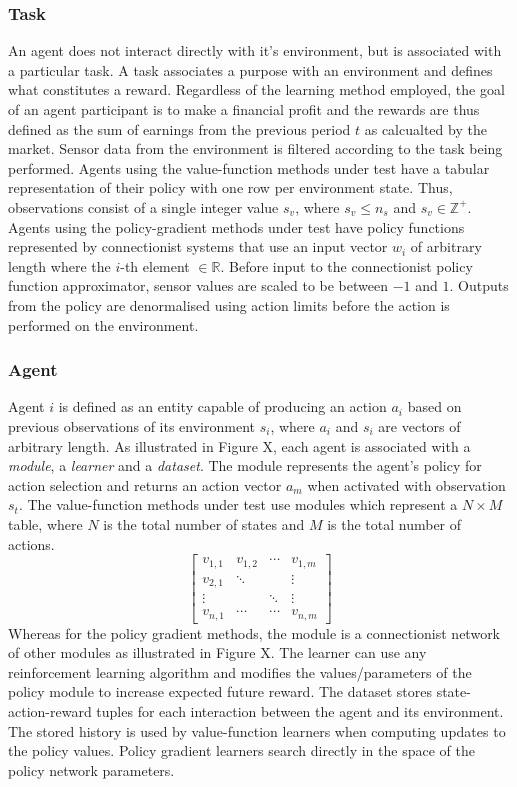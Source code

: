 \subsubsection{Task}
An agent does not interact directly with it's environment, but is associated
with a particular task.  A task associates a purpose with an environment and
defines what constitutes a reward.  Regardless of the learning method employed,
the goal of an agent participant is to make a financial profit and the rewards
are thus defined as the sum of earnings from the previous period $t$ as
calcualted by the market.  Sensor data from the environment is filtered
according to the task being performed.  Agents using the value-function methods
under test have a tabular representation of their policy with one row per
environment state.  Thus, observations consist of a single integer value $s_v$,
where $s_v \leq n_s$ and $s_v \in \mathbb{Z}^+$.  Agents using the
policy-gradient methods under test have policy functions represented by
connectionist systems that use an input vector $w_i$ of arbitrary length where
the $i$-th element $\in \mathbb{R}$.  Before input to the connectionist policy
function approximator, sensor values are scaled to be between $-1$ and $1$.
Outputs from the policy are denormalised using action limits before the
action is performed on the environment.

\subsubsection{Agent}
Agent $i$ is defined as an entity capable of producing an action $a_i$
based on previous observations of its environment $s_i$, where $a_i$ and $s_i$
are vectors of arbitrary length.  As illustrated in Figure X, each agent is
associated with a \textit{module}, a \textit{learner} and a \textit{dataset}.
The module represents the agent's policy for action selection and returns an
action vector $a_m$ when activated with observation $s_t$.  The value-function
methods under test use modules which represent a $N \times M$ table, where $N$
is the total number of states and $M$ is the total number of actions.
\begin{equation}
\begin{bmatrix}
v_{1,1}& v_{1,2}& \dotsb& v_{1,m}\\
v_{2,1}& \ddots& & \vdots\\
\vdots& &\ddots& \vdots\\
v_{n,1}& \dotsb& \dotsb& v_{n,m}
\end{bmatrix}
\end{equation}
Whereas for the policy gradient methods, the module is a connectionist network
of other modules as illustrated in Figure X.  The learner can use any
reinforcement learning algorithm and modifies the values/parameters of the
policy module to increase expected future reward.  The dataset stores
state-action-reward tuples for each interaction between the agent and its
environment.  The stored history is used by value-function learners when
computing updates to the policy values.  Policy gradient learners search
directly in the space of the policy network parameters.

